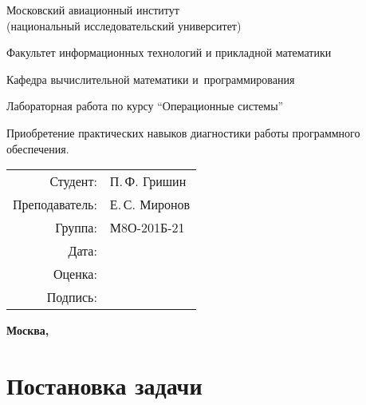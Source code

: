 \documentclass[pdf, unicode, 12pt, a4paper,oneside,fleqn]{article}
\begin{document}
\begin{titlepage}
    \begin{center}
        \bfseries

        {\Large Московский авиационный институт\\ (национальный исследовательский университет)}
        
        \vspace{48pt}
        
        {\large Факультет информационных технологий и прикладной математики}
        
        \vspace{36pt}
        
        {\large Кафедра вычислительной математики и~программирования}
        
        \vspace{48pt}
        
        Лабораторная работа  по курсу \enquote{Операционные системы}

        \vspace{48pt}

        Приобретение практических навыков диагностики работы программного обеспечения.
    \end{center}
    
    \vspace{150pt}
    
    \begin{flushright}
    \begin{tabular}{rl}
    Студент: & П.\,Ф. Гришин \\
    Преподаватель: & Е.\,С. Миронов \\
    Группа: & М8О-201Б-21 \\
    Дата: & \\
    Оценка: & \\
    Подпись: & \\
    \end{tabular}
    \end{flushright}
    
    \vfill
    
    \begin{center}
    \bfseries
    Москва, \the\year
    \end{center}
\end{titlepage}
    
\pagebreak

\section{Постановка задачи}
\end{document}
